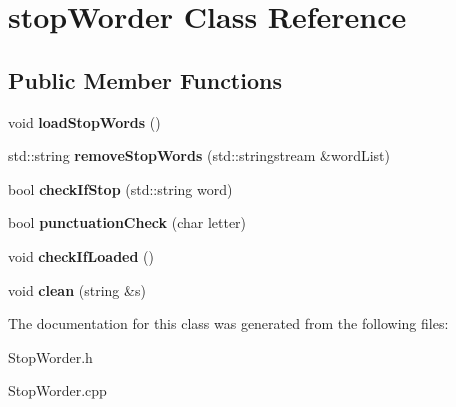 \hypertarget{classstop_worder}{\section{stop\+Worder Class Reference}
\label{classstop_worder}
}
\subsection*{Public Member Functions}
\begin{DoxyCompactItemize}
\item 
\hypertarget{classstop_worder_ad3a78eea2bf46b9f470267a4e7080f8d}{void {\bfseries load\+Stop\+Words} ()}\label{classstop_worder_ad3a78eea2bf46b9f470267a4e7080f8d}

\item 
\hypertarget{classstop_worder_a8fc9aae41e9744a89e491aa794e3c4b7}{std\+::string {\bfseries remove\+Stop\+Words} (std\+::stringstream \&word\+List)}\label{classstop_worder_a8fc9aae41e9744a89e491aa794e3c4b7}

\item 
\hypertarget{classstop_worder_a0d8447c55b750bb1929524d0d9817f31}{bool {\bfseries check\+If\+Stop} (std\+::string word)}\label{classstop_worder_a0d8447c55b750bb1929524d0d9817f31}

\item 
\hypertarget{classstop_worder_ad9155d34060767386dcb06dec394b56a}{bool {\bfseries punctuation\+Check} (char letter)}\label{classstop_worder_ad9155d34060767386dcb06dec394b56a}

\item 
\hypertarget{classstop_worder_a4275303ee66baeec417464b35e335345}{void {\bfseries check\+If\+Loaded} ()}\label{classstop_worder_a4275303ee66baeec417464b35e335345}

\item 
\hypertarget{classstop_worder_afa06f9295c87260f5175962a7c321806}{void {\bfseries clean} (string \&s)}\label{classstop_worder_afa06f9295c87260f5175962a7c321806}

\end{DoxyCompactItemize}


The documentation for this class was generated from the following files\+:\begin{DoxyCompactItemize}
\item 
Stop\+Worder.\+h\item 
Stop\+Worder.\+cpp\end{DoxyCompactItemize}
